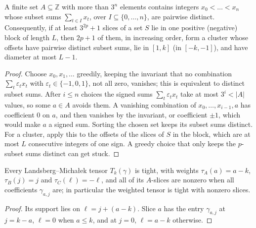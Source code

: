 \begin{lemma}
  \label{lem:frontiers-greedy-subset-sums}
  \leanok
  A finite set $A \subseteq \mathbb{Z}$ with more than $3^n$ elements contains integers
  $x_0 < \dots < x_n$ whose subset sums $\sum_{t \in I} x_t$, over
  $I \subseteq \{0, \dots, n\}$, are pairwise distinct. Consequently, if at least
  $3^{2p} + 1$ slices of a set $S$ lie in one positive (negative) block of length $L$, then
  $2p + 1$ of them, in increasing order, form a cluster whose offsets have pairwise distinct
  subset sums, lie in $[1, k]$ (in $[-k, -1]$), and have diameter at most $L - 1$.
\end{lemma}
\begin{proof}
  \leanok
  Choose $x_0, x_1, \dots$ greedily, keeping the invariant that no combination
  $\sum_t \varepsilon_t x_t$ with $\varepsilon_t \in \{-1, 0, 1\}$, not all zero, vanishes;
  this is equivalent to distinct subset sums. After $i \le n$ choices the signed sums
  $\sum_t \varepsilon_t x_t$ take at most $3^i < |A|$ values, so some $a \in A$ avoids them.
  A vanishing combination of $x_0, \dots, x_{i-1}, a$ has coefficient $0$ on $a$, and then
  vanishes by the invariant, or coefficient $\pm 1$, which would make $a$ a signed sum.
  Sorting the chosen set keeps its subset sums distinct. For a cluster, apply this to the
  offsets of the slices of $S$ in the block, which are at most $L$ consecutive integers of one
  sign. A greedy choice that only keeps the $p$-subset sums distinct can get stuck.
\end{proof}

\begin{lemma}
  \label{lem:frontiers-lm-tight}
  \leanok
  Every Landsberg--Micha{\l}ek tensor $T_k(\gamma)$ is tight, with weights
  $\tau_A(a) = a - k$, $\tau_B(j) = j$ and $\tau_C(\ell) = -\ell$, and all of its
  $A$-slices are nonzero when all coefficients $\gamma_{a, j}$ are; in particular the weighted
  tensor is tight with nonzero slices.
\end{lemma}
\begin{proof}
  \leanok
  Its support lies on $\ell = j + (a - k)$. Slice $a$ has the entry $\gamma_{a, j}$ at
  $j = k - a$, $\ell = 0$ when $a \le k$, and at $j = 0$, $\ell = a - k$ otherwise.
\end{proof}

